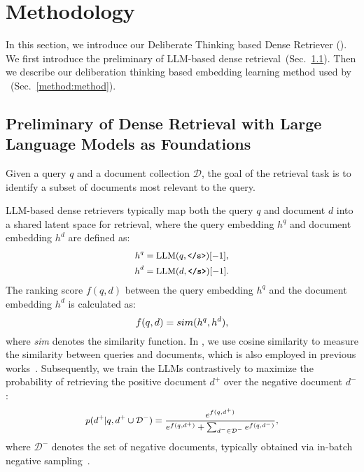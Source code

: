 \section{Methodology}
In this section, we introduce our Deliberate Thinking based Dense Retriever (\method{}).
We first introduce the preliminary of LLM-based dense retrieval~(Sec.~\ref{method:preliminary}). Then we describe our deliberation thinking based embedding learning method used by \method{}~(Sec.~\ref{method:method}).

\subsection{Preliminary of Dense Retrieval with Large Language Models as Foundations}
\label{method:preliminary}
Given a query $q$ and a document collection $\mathcal{D}$, the goal of the retrieval task is to identify a subset of documents most relevant to the query.

LLM-based dense retrievers typically map both the query $q$ and document $d$ into a shared latent space for retrieval, where the query embedding $h^q$ and document embedding $h^d$ are defined as:
\begin{equation}\small
\begin{aligned} 
\label{eq:preliminary}
h^q &= \text{LLM}( q, \text{\texttt{</s>}})[-1],\\
h^d &= \text{LLM}( d, \text{\texttt{</s>}})[-1].
\end{aligned} 
\end{equation}
The ranking score $f(q, d)$ between the query embedding $h^q$ and the document embedding $h^d$ is calculated as:
\begin{equation}\small
f(q, d) = sim(h^q, h^d),
\end{equation}
where \textit{sim} denotes the similarity function. In \method{}, we use cosine similarity to measure the similarity between queries and documents, which is also employed in previous works~\cite{wang2023improving, behnamghader2024llm2vec}. Subsequently, we train the LLMs contrastively to maximize the probability of retrieving the positive document $d^+$ over the negative document $d^-$:
\begin{equation}\small
\begin{aligned} 
\label{eq:prob} 
p(d^{+}|q, {d^{+}}\cup\mathcal{D}^{-}) = \frac{e^{f(q, d^+)}}{e^{f(q, d^+)} + \sum_{d^-\in \mathcal{D}^-} e^{f(q, d^-)}}, \end{aligned} 
\end{equation}
where $\mathcal{D}^{-}$ denotes the set of negative documents, typically obtained via in-batch negative sampling~\cite{karpukhin2020dense}. 


